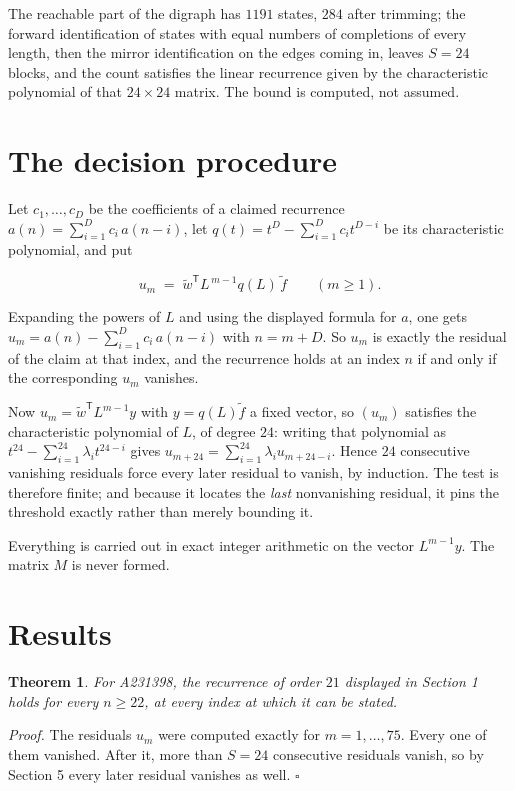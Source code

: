 \documentclass[11pt]{article}
\newtheorem{theorem}{Theorem}
\theoremstyle{definition}
\begin{document}
The reachable part of the digraph has $1191$ states, $284$ after trimming; the forward identification of states with equal numbers of completions of every length, then the mirror identification on the edges coming in, leaves $S = 24$ blocks, and the count satisfies the linear recurrence given by the characteristic polynomial of that $24\times24$ matrix. The bound is computed, not assumed.

\section{The decision procedure}

Let $c_1,\dots,c_D$ be the coefficients of a claimed recurrence $a(n) = \sum_{i=1}^{D} c_i\,a(n-i)$, let $q(t) = t^{D} - \sum_{i=1}^{D} c_i t^{D-i}$ be its characteristic polynomial, and put

\[u_m \;=\; \tilde w^{\mathsf T} L^{\,m-1} q(L)\,\tilde f \qquad (m \ge 1).\]

Expanding the powers of $L$ and using the displayed formula for $a$, one gets $u_m = a(n) - \sum_{i=1}^{D} c_i\,a(n-i)$ with $n = m + D$. So $u_m$ is exactly the residual of the claim at that index, and the recurrence holds at an index $n$ if and only if the corresponding $u_m$ vanishes.

Now $u_m = \tilde w^{\mathsf T} L^{m-1} y$ with $y = q(L)\tilde f$ a fixed vector, so $(u_m)$ satisfies the characteristic polynomial of $L$, of degree $24$: writing that polynomial as $t^{24} - \sum_{i=1}^{24} \lambda_i t^{24-i}$ gives $u_{m+24} = \sum_{i=1}^{24} \lambda_i u_{m+24-i}$. Hence $24$ consecutive vanishing residuals force every later residual to vanish, by induction. The test is therefore finite; and because it locates the {\itshape last} nonvanishing residual, it pins the threshold exactly rather than merely bounding it.

Everything is carried out in exact integer arithmetic on the vector $L^{m-1}y$. The matrix $M$ is never formed.

\section{Results}

\begin{theorem} For A231398, the recurrence of order $21$ displayed in Section 1 holds for every $n \ge 22$, at every index at which it can be stated.\end{theorem}

{\itshape Proof.} The residuals $u_m$ were computed exactly for $m = 1,\dots,75$. Every one of them vanished. After it, more than $S = 24$ consecutive residuals vanish, so by Section 5 every later residual vanishes as well. $\square$
\end{document}

